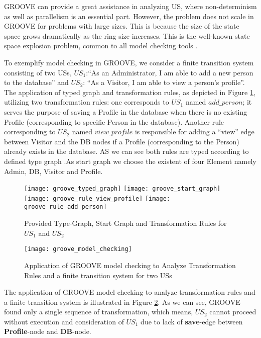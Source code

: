 GROOVE can provide a great assistance in analyzing US, where non-determinism as well as parallelism is an essential part. However, the problem does not scale in GROOVE for problems with large sizes. This is because the size of the state space grows dramatically as the ring size increases. This is the well-known state space explosion problem, common to all model checking tools \cite{rensink2004representing}.
\begin{example}
To exemplify model checking in GROOVE, we consider a finite transition system consisting of two USs, $US_1$:\enquote{As an Administrator, I am able to add a new person to the database} and  $US_2$: \enquote{As a Visitor, I am able to view a person’s proﬁle}. The application of typed graph and transformation rules, as depicted in Figure \ref{fig:groove_transformation_rules}, utilizing two transformation rules: one corresponds to $US_1$ named $add\_person$; it serves the purpose of saving a Profile in the database when there is no existing Profile (corresponding to specific Person in the database). Another rule corresponding to $US_2$ named $view\_profile$ is responsible for adding a \enquote{view} edge between Visitor and the DB nodes if a Profile (corresponding to the Person) already exists in the database. AS we can see both rules are typed according to defined type graph .As start graph we choose the existent of four Element namely Admin, DB, Visitor and Profile.
\begin{figure}
\center
\texttt{[image: groove\_typed\_graph]}
\texttt{[image: groove\_start\_graph]}
\texttt{[image: groove\_rule\_view\_profile]}
\texttt{[image: groove\_rule\_add\_person]}
\caption{Provided Type-Graph, Start Graph and Transformation Rules for $US_1$ and $US_2$ } \label{fig:groove_transformation_rules}
\end{figure}
\begin{figure}
\center
\texttt{[image: groove\_model\_checking]}
\caption{Application of GROOVE model checking to Analyze Transformation Rules and a finite transition system for two USs }\label{fig:groove_model_checking}
\end{figure}
\end{example}
The application of GROOVE model checking to analyze transformation rules and a finite transition system is illustrated in Figure \ref{fig:groove_model_checking}. As we can see, GROOVE found only a single sequence of transformation, which means, $US_2$ cannot proceed without execution and consideration of $US_1$ due to lack of \textbf{save}-edge between \textbf{Profile}-node and \textbf{DB}-node. 


